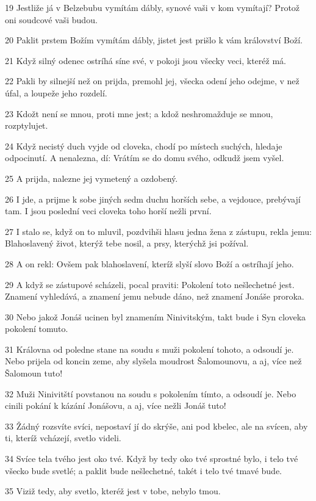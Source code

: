 \par 19 Jestliže já v Belzebubu vymítám dábly, synové vaši v kom vymítají? Protož oni soudcové vaši budou.
\par 20 Paklit prstem Božím vymítám dábly, jistet jest prišlo k vám království Boží.
\par 21 Když silný odenec ostríhá síne své, v pokoji jsou všecky veci, kteréž má.
\par 22 Pakli by silnejší než on prijda, premohl jej, všecka odení jeho odejme, v než úfal, a loupeže jeho rozdelí.
\par 23 Kdožt není se mnou, proti mne jest; a kdož neshromažduje se mnou, rozptylujet.
\par 24 Když necistý duch vyjde od cloveka, chodí po místech suchých, hledaje odpocinutí. A nenalezna, dí: Vrátím se do domu svého, odkudž jsem vyšel.
\par 25 A prijda, nalezne jej vymetený a ozdobený.
\par 26 I jde, a prijme k sobe jiných sedm duchu horších sebe, a vejdouce, prebývají tam. I jsou poslední veci cloveka toho horší nežli první.
\par 27 I stalo se, když on to mluvil, pozdvihši hlasu jedna žena z zástupu, rekla jemu: Blahoslavený život, kterýž tebe nosil, a prsy, kterýchž jsi požíval.
\par 28 A on rekl: Ovšem pak blahoslavení, kteríž slyší slovo Boží a ostríhají jeho.
\par 29 A když se zástupové scházeli, pocal praviti: Pokolení toto nešlechetné jest. Znamení vyhledává, a znamení jemu nebude dáno, než znamení Jonáše proroka.
\par 30 Nebo jakož Jonáš ucinen byl znamením Ninivitským, takt bude i Syn cloveka pokolení tomuto.
\par 31 Královna od poledne stane na soudu s muži pokolení tohoto, a odsoudí je. Nebo prijela od koncin zeme, aby slyšela moudrost Šalomounovu, a aj, více než Šalomoun tuto!
\par 32 Muži Ninivitští povstanou na soudu s pokolením tímto, a odsoudí je. Nebo cinili pokání k kázání Jonášovu, a aj, více nežli Jonáš tuto!
\par 33 Žádný rozsvíte svíci, nepostaví jí do skrýše, ani pod kbelec, ale na svícen, aby ti, kteríž vcházejí, svetlo videli.
\par 34 Svíce tela tvého jest oko tvé. Když by tedy oko tvé sprostné bylo, i telo tvé všecko bude svetlé; a paklit bude nešlechetné, takét i telo tvé tmavé bude.
\par 35 Viziž tedy, aby svetlo, kteréž jest v tobe, nebylo tmou.
